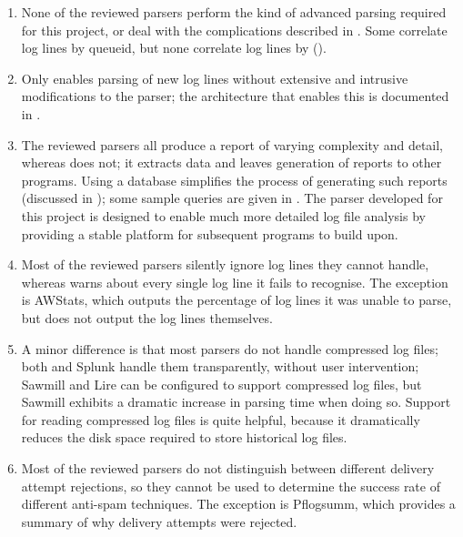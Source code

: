 \begin{enumerate}

    \item None of the reviewed parsers perform the kind of advanced parsing
        required for this project, or deal with the complications described
        in .  Some correlate log lines by
        queueid, but none correlate log lines by 
        ().

    \item Only \parsername{} enables parsing of new log lines without
        extensive and intrusive modifications to the parser; the
        architecture that enables this is documented in .

    \item The reviewed parsers all produce a report of varying complexity
        and detail, whereas \parsername{} does not; it extracts data and
        leaves generation of reports to other programs.  Using a
         database simplifies the process of generating such
        reports (discussed in ); some sample
        queries are given in .  The parser developed
        for this project is designed to enable much more detailed log file
        analysis by providing a stable platform for subsequent programs to
        build upon.

    \item Most of the reviewed parsers silently ignore log lines they
        cannot handle, whereas \parsername{} warns about every single log
        line it fails to recognise.  The exception is AWStats, which
        outputs the percentage of log lines it was unable to parse, but
        does not output the log lines themselves.

    \item A minor difference is that most parsers do not handle compressed
        log files; both \parsername{} and Splunk handle them transparently,
        without user intervention; Sawmill and Lire can be configured to
        support compressed log files, but Sawmill exhibits a dramatic
        increase in parsing time when doing so.  Support for reading
        compressed log files is quite helpful, because it dramatically
        reduces the disk space required to store historical log files.

    \item Most of the reviewed parsers do not distinguish between different
        delivery attempt rejections, so they cannot be used to determine
        the success rate of different anti-spam techniques.  The exception
        is Pflogsumm, which provides a summary of why delivery attempts
        were rejected.

\end{enumerate}

